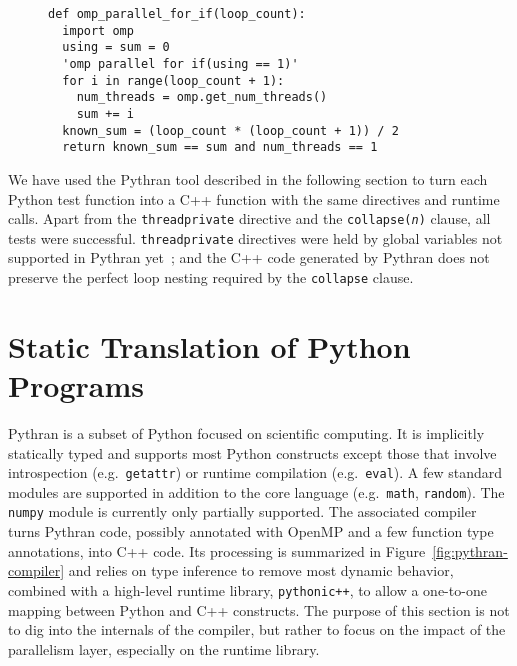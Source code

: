 \documentclass{llncs}
\begin{document}
\begin{figure}
    \begin{lstlisting}[label={lst:openmp-validation},caption={Example of Python
    OpenMP validation test case.}]
def omp_parallel_for_if(loop_count):
  import omp
  using = sum = 0
  'omp parallel for if(using == 1)'
  for i in range(loop_count + 1):
    num_threads = omp.get_num_threads()
    sum += i
  known_sum = (loop_count * (loop_count + 1)) / 2
  return known_sum == sum and num_threads == 1
    \end{lstlisting}
\end{figure}

We have used the Pythran tool described in the following section to turn each
Python test function into a C++ function with the same directives and runtime
calls. Apart from the \texttt{threadprivate} directive and the
\texttt{collapse(\emph{n})} clause, all tests were successful.
\texttt{threadprivate} directives were held by global variables not supported in
Pythran yet~; and the C++ code generated by Pythran does not preserve the perfect
loop nesting required by the \texttt{collapse} clause.

\section{Static Translation of Python Programs}\label{sec:python-static}

Pythran is a subset of Python focused on scientific computing. It is implicitly
statically typed and supports most Python constructs except those that involve
introspection (e.g.\ \texttt{getattr}) or runtime compilation (e.g.\
\texttt{eval}). A few standard modules are supported in addition to the core
language (e.g.\ \texttt{math}, \texttt{random}). The \texttt{numpy} module is
currently only partially supported. The associated compiler turns Pythran code,
possibly annotated with OpenMP and a few function type annotations, into C++
code. Its processing is summarized in Figure~\ref{fig:pythran-compiler} and
relies on type inference to remove most dynamic behavior, combined with a
high-level runtime library, \texttt{pythonic++}, to allow a one-to-one mapping
between Python and C++ constructs. The purpose of this section is not to dig
into the internals of the compiler, but rather to focus on the impact of the
parallelism layer, especially on the runtime library.
\end{document}
